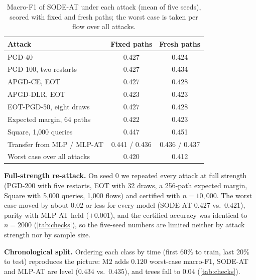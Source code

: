 \documentclass{article}
\theoremstyle{definition}
\begin{document}
\begin{table}[t]
\caption{Macro-F1 of SODE-AT under each attack (mean of five seeds), scored with
fixed and fresh paths; the worst case is taken per flow over all attacks.}
\label{tab:attacks}
\centering\small
\begin{tabular}{lcc}
\toprule
Attack & Fixed paths & Fresh paths\\
\midrule
PGD-40 & 0.427 & 0.424\\
PGD-100, two restarts & 0.427 & 0.434\\
APGD-CE, EOT & 0.427 & 0.428\\
APGD-DLR, EOT & 0.423 & 0.423\\
EOT-PGD-50, eight draws & 0.427 & 0.428\\
Expected margin, 64 paths & 0.422 & 0.423\\
Square, 1{,}000 queries & 0.447 & 0.451\\
Transfer from MLP / MLP-AT & 0.441 / 0.436 & 0.436 / 0.437\\
\midrule
Worst case over all attacks & 0.420 & 0.412\\
\bottomrule
\end{tabular}
\end{table}

\textbf{Full-strength re-attack.} On seed 0 we repeated every attack at full
strength (PGD-200 with five restarts, EOT with 32 draws, a 256-path expected
margin, Square with 5{,}000 queries, 1{,}000 flows) and certified with
$n=10{,}000$. The worst case moved by about $0.02$ or less for every model
(SODE-AT $0.427$ vs.\ $0.421$), parity with MLP-AT held ($+0.001$), and the
certified accuracy was identical to $n=2000$ (\cref{tab:checks}), so the
five-seed numbers are limited neither by attack strength nor by sample size.

\textbf{Chronological split.} Ordering each class by time (first 60\% to train,
last 20\% to test) reproduces the picture: M2 adds $0.120$ worst-case macro-F1,
SODE-AT and MLP-AT are level ($0.434$ vs.\ $0.435$), and trees fall to $0.04$
(\cref{tab:checks}).
\end{document}
